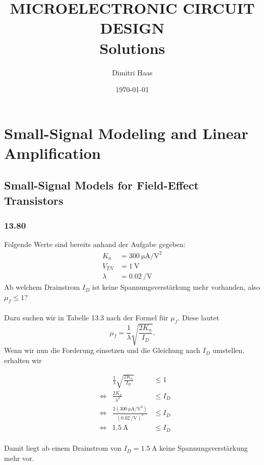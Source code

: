 \documentclass[11pt,a4paper,titlepage]{article}
\title{\blue MICROELECTRONIC CIRCUIT DESIGN \\	\blueb Solutions}
\author{Dimitri Haas}
\date{\today}
\begin{document}
\maketitle
\setcounter{section}{12}
\section{Small-Signal Modeling and Linear Amplification}
\setcounter{subsection}{7}
\subsection{Small-Signal Models for Field-Effect Transistors}
\subsubsection*{13.80}
Folgende Werte sind bereits anhand der Aufgabe gegeben:
\begin{equation*}
\begin{aligned}
K_n &= \SI{300}{\micro\ampere\per\square\volt}\\
V_{TN} &= \SI{1}{\volt}\\
\lambda &= \SI{0.02}{\per\volt}
\end{aligned}
\end{equation*}
Ab welchem Drainstrom $I_D$ ist keine Spannungsverstärkung mehr vorhanden, also $\mu_f \leq 1$?\\
\\
Dazu suchen wir in Tabelle 13.3 nach der Formel für $\mu_f$. Diese lautet
\[\mu_f = \frac{1}{\lambda}\sqrt{\frac{2K_n}{I_D}}.\]
Wenn wir nun die Forderung einsetzen und die Gleichung nach $I_D$ umstellen, erhalten wir

\begin{equation*}
\begin{aligned}
 & &\frac{1}{\lambda}\sqrt{\frac{2K_n}{I_D}} &\leq 1 \\
& \Leftrightarrow & \frac{2K_n}{\lambda^2} &\leq I_D \\
& \Leftrightarrow & \frac{2(\SI{300}{\micro\ampere\per\square\volt})}{(\SI{0.02}{\per\volt})^2} &\leq I_D \\
& \Leftrightarrow & \SI{1.5}{\ampere} &\leq I_D
\end{aligned}
\end{equation*}\\
Damit liegt ab einem Drainstrom von $I_D = \SI{1.5}{\ampere}$ keine Spannungsverstärkung mehr vor.
\end{document}

